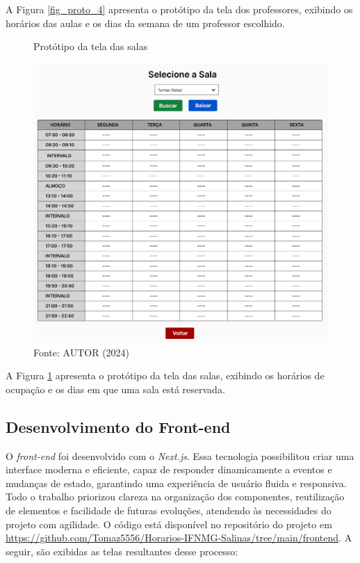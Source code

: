 A Figura \ref{fig_proto_4} apresenta o protótipo da tela dos professores, exibindo os horários das aulas e os dias da semana de um professor escolhido.

\begin{figure}[H]
    \centering
    \caption{Protótipo da tela das salas}
    \includegraphics[width=1\textwidth]{Figuras/proto-5.PNG}
    \caption*{Fonte: AUTOR (2024)}
    \label{fig_proto_5}
\end{figure}

A Figura \ref{fig_proto_5} apresenta o protótipo da tela das salas, exibindo os horários de ocupação e os dias em que uma sala está reservada.

\subsection{Desenvolvimento do Front-end}

O \textit{front-end} foi desenvolvido com o \textit{Next.js}. Essa tecnologia possibilitou criar uma interface moderna e eficiente, capaz de responder dinamicamente a eventos e mudanças de estado, garantindo uma experiência de usuário fluida e responsiva. Todo o trabalho priorizou clareza na organização dos componentes, reutilização de elementos e facilidade de futuras evoluções, atendendo às necessidades do projeto com agilidade. O código está disponível no repositório do projeto em \url{https://github.com/Tomaz5556/Horarios-IFNMG-Salinas/tree/main/frontend}. A seguir, são exibidas as telas resultantes desse processo:

